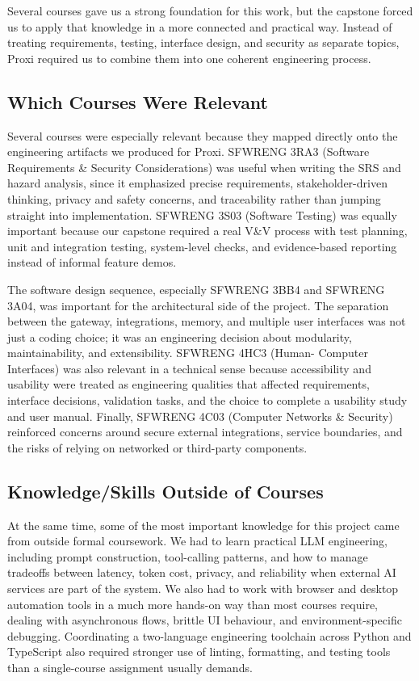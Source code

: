 \documentclass{article}
\begin{document}
Several courses gave us a strong foundation for this work, but the
capstone forced us to apply that knowledge in a more connected and
practical way.
Instead of treating requirements, testing, interface design, and
security as separate topics, Proxi required us to combine them into one
coherent engineering process.

\subsection{Which Courses Were Relevant}

Several courses were especially relevant because they mapped directly
onto the engineering artifacts we produced for Proxi. SFWRENG 3RA3
(Software Requirements \& Security Considerations) was useful when
writing the SRS and hazard analysis, since it emphasized precise
requirements, stakeholder-driven thinking, privacy and safety concerns,
and traceability rather than jumping straight into implementation.
SFWRENG 3S03 (Software Testing) was equally important because our
capstone required a real V\&V process with test planning, unit and
integration testing, system-level checks, and evidence-based reporting
instead of informal feature demos.

The software design sequence, especially SFWRENG 3BB4 and SFWRENG 3A04,
was important for the architectural side of the project. The separation
between the gateway, integrations, memory, and multiple user interfaces
was not just a coding choice; it was an engineering decision about
modularity, maintainability, and extensibility. SFWRENG 4HC3 (Human-
Computer Interfaces) was also relevant in a technical sense because
accessibility and usability were treated as engineering qualities that
affected requirements, interface decisions, validation tasks, and the
choice to complete a usability study and user manual. Finally,
SFWRENG 4C03 (Computer Networks \& Security) reinforced concerns around
secure external integrations, service boundaries, and the risks of
relying on networked or third-party components.

\subsection{Knowledge/Skills Outside of Courses}

At the same time, some of the most important knowledge for this project
came from outside formal coursework. We had to learn practical LLM
engineering, including prompt construction, tool-calling patterns, and
how to manage tradeoffs between latency, token cost, privacy, and
reliability when external AI services are part of the system. We also
had to work with browser and desktop automation tools in a much more
hands-on way than most courses require, dealing with asynchronous flows,
brittle UI behaviour, and environment-specific debugging. Coordinating a
two-language engineering toolchain across Python and TypeScript also
required stronger use of linting, formatting, and testing tools than a
single-course assignment usually demands.
\end{document}
